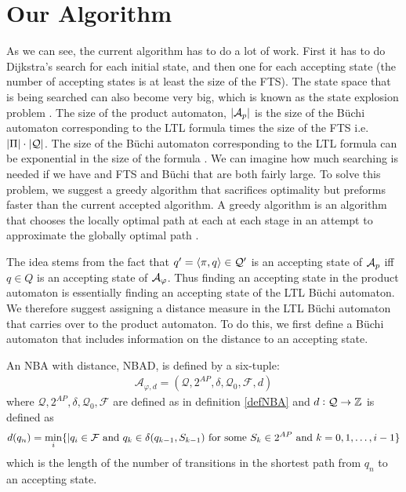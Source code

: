 \section{Our Algorithm}
As we can see, the current algorithm has to do a lot of work. First it has to do Dijkstra's search for each initial state, and then one for each accepting state (the number of accepting states is at least the size of the FTS). The state space that is being searched can also become very big, which is known as the state explosion problem \cite{clarke99}. The size of the product automaton, $|\mathcal{A}_p|$ is the size of the B\"{u}chi automaton corresponding to the LTL formula times the size of the FTS i.e.\ $|\Pi| \cdot |\mathcal{Q}|$. The size of the B\"{u}chi automaton corresponding to the LTL formula can be exponential in the size of the formula \cite{giannakopoulou02}. We can imagine how much searching is needed if we have and FTS and B\"{u}chi that are both fairly large. To solve this problem, we suggest a greedy algorithm that sacrifices optimality but preforms faster than the current accepted algorithm. A greedy algorithm is an algorithm that chooses the locally optimal path at each at each stage in an attempt to approximate the globally optimal path \cite{corman01}.

The idea stems from the fact that $q' = \langle \pi, q \rangle \in \mathcal{Q}'$ is an accepting state of $\mathcal{A}_p$ iff $q \in Q$ is an accepting state of $\mathcal{A}_\varphi$. Thus finding an accepting state in the product automaton is essentially finding an accepting state of the LTL B\"{u}chi automaton. We therefore suggest assigning a distance measure in the LTL B\"{u}chi automaton that carries over to the product automaton. To do this, we first define a B\"{u}chi automaton that includes information on the distance to an accepting state.

\begin{definition}
\label{defBWD}
An NBA with distance, NBAD, is defined by a six-tuple:
\begin{align*}
\mathcal{A}_{\varphi,d} = (\mathcal{Q},2^{AP},\delta,\mathcal{Q}_0,\mathcal{F},d)
\end{align*}
where $\mathcal{Q},2^{AP},\delta,\mathcal{Q}_0,\mathcal{F}$ are defined as in definition \ref{defNBA} and $d:\mathcal{Q} \rightarrow \mathbb{Z}$ is defined as 
\begin{align*}
d(q_n) = \min_i \{ | q_i \in \mathcal{F} \text{ and } q_k \in \delta(q_{k-1},S_{k-1}) \text{ for some } S_k \in 2^{AP} \text{ and } k = 0,1,\dots, i-1 \}
\end{align*}
which is the length of the number of transitions in the shortest path from $q_n$ to an accepting state.
\end{definition}

